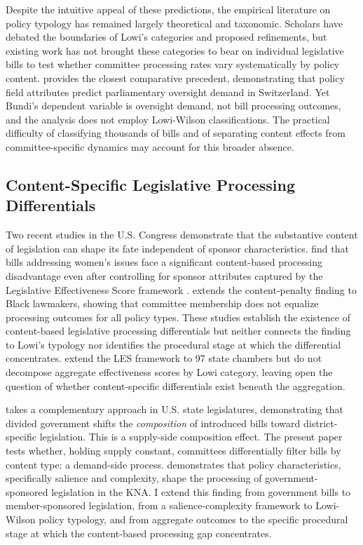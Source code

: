 \documentclass[11pt]{article}
\begin{document}
Despite the intuitive appeal of these predictions, the empirical literature on policy typology has remained largely theoretical and taxonomic. Scholars have debated the boundaries of Lowi's categories and proposed refinements, but existing work has not brought these categories to bear on individual legislative bills to test whether committee processing rates vary systematically by policy content. \citet{bundi2017} provides the closest comparative precedent, demonstrating that policy field attributes predict parliamentary oversight demand in Switzerland. Yet Bundi's dependent variable is oversight demand, not bill processing outcomes, and the analysis does not employ Lowi-Wilson classifications. The practical difficulty of classifying thousands of bills and of separating content effects from committee-specific dynamics may account for this broader absence.

\subsection{Content-Specific Legislative Processing Differentials}

Two recent studies in the U.S. Congress demonstrate that the substantive content of legislation can shape its fate independent of sponsor characteristics. \citet{volden2016} find that bills addressing women's issues face a significant content-based processing disadvantage even after controlling for sponsor attributes captured by the Legislative Effectiveness Score framework \citep{volden2014}. \citet{peay2020} extends the content-penalty finding to Black lawmakers, showing that committee membership does not equalize processing outcomes for all policy types. These studies establish the existence of content-based legislative processing differentials but neither connects the finding to Lowi's typology nor identifies the procedural stage at which the differential concentrates. \citet{bucchianeri2024} extend the LES framework to 97 state chambers but do not decompose aggregate effectiveness scores by Lowi category, leaving open the question of whether content-specific differentials exist beneath the aggregation.

\citet{craig2023} takes a complementary approach in U.S. state legislatures, demonstrating that divided government shifts the \emph{composition} of introduced bills toward district-specific legislation. This is a supply-side composition effect. The present paper tests whether, holding supply constant, committees differentially filter bills by content type: a demand-side process. \citet{lee2021} demonstrates that policy characteristics, specifically salience and complexity, shape the processing of government-sponsored legislation in the KNA. I extend this finding from government bills to member-sponsored legislation, from a salience-complexity framework to Lowi-Wilson policy typology, and from aggregate outcomes to the specific procedural stage at which the content-based processing gap concentrates.
\end{document}
